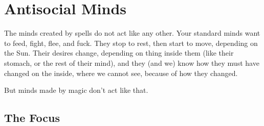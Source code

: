 \chapter{Antisocial Minds}

The minds created by spells do not act like any other.
Your standard minds want to feed, fight, flee, and fuck.
They stop to rest, then start to move, depending on the Sun.
Their desires change, depending on thing inside them (like their stomach, or the rest of their mind), and they (and we) know how they must have changed on the inside, where we cannot see, because of how they changed.

But minds made by magic don't act like that.

\section{The Focus}

